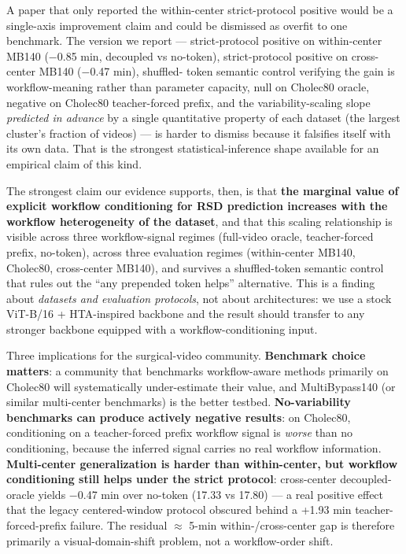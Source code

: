 A paper that only reported the within-center strict-protocol positive
would be a single-axis improvement claim and could be dismissed as
overfit to one benchmark. The version we report --- strict-protocol
positive on within-center MB140 ($-$0.85 min, decoupled vs no-token),
strict-protocol positive on cross-center MB140 ($-$0.47 min), shuffled-
token semantic control verifying the gain is workflow-meaning rather
than parameter capacity, null on Cholec80 oracle, negative on Cholec80
teacher-forced prefix, and the variability-scaling slope \emph{predicted
in advance} by a single quantitative property of each dataset (the
largest cluster's fraction of videos) --- is harder to dismiss because
it falsifies itself with its own data. That is the strongest
statistical-inference shape available for an empirical claim of this
kind.

The strongest claim our evidence supports, then, is that \textbf{the
marginal value of explicit workflow conditioning for RSD prediction
increases with the workflow heterogeneity of the dataset}, and that this
scaling relationship is visible across three workflow-signal regimes
(full-video oracle, teacher-forced prefix, no-token), across three
evaluation regimes (within-center MB140, Cholec80, cross-center MB140),
and survives a shuffled-token semantic control that rules out the ``any
prepended token helps'' alternative. This is a finding about
\emph{datasets and evaluation protocols}, not about architectures: we
use a stock ViT-B/16 + HTA-inspired backbone and the result should
transfer to any stronger backbone equipped with a workflow-conditioning
input.

Three implications for the surgical-video community. \textbf{Benchmark
choice matters}: a community that benchmarks workflow-aware methods
primarily on Cholec80 will systematically under-estimate their value,
and MultiBypass140 (or similar multi-center benchmarks) is the better
testbed. \textbf{No-variability benchmarks can produce actively negative
results}: on Cholec80, conditioning on a teacher-forced prefix workflow
signal is \emph{worse} than no conditioning, because the inferred signal
carries no real workflow information. \textbf{Multi-center
generalization is harder than within-center, but workflow conditioning
still helps under the strict protocol}: cross-center decoupled-oracle
yields $-$0.47 min over no-token (17.33 vs 17.80) --- a real positive
effect that the legacy centered-window protocol obscured behind a +1.93
min teacher-forced-prefix failure. The residual $\approx$ 5-min
within-/cross-center gap is therefore primarily a visual-domain-shift
problem, not a workflow-order shift.

